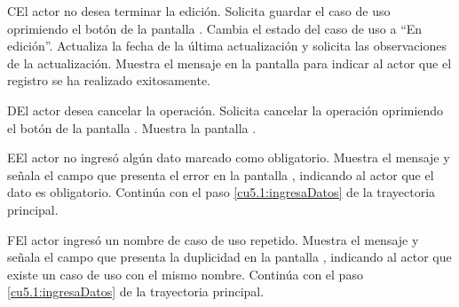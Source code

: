  \begin{UCtrayectoriaA}{C}{El actor no desea terminar la edición.}
    \UCpaso[\UCactor] Solicita guardar el caso de uso oprimiendo el botón  de la pantalla .
    \UCpaso[\UCsist] Cambia el estado del caso de uso a ``En edición''.
    \UCpaso[\UCsist] Actualiza la fecha de la última actualización y solicita las observaciones de la actualización.
    \UCpaso[\UCsist] Muestra el mensaje  en la pantalla  
    para indicar al actor que el registro se ha realizado exitosamente.
 \end{UCtrayectoriaA}
 \begin{UCtrayectoriaA}{D}{El actor desea cancelar la operación.}
    \UCpaso[\UCactor] Solicita cancelar la operación oprimiendo el botón  de la pantalla .
    \UCpaso[\UCsist] Muestra la pantalla .
 \end{UCtrayectoriaA}
 \begin{UCtrayectoriaA}{E}{El actor no ingresó algún dato marcado como obligatorio.}
    \UCpaso[\UCsist] Muestra el mensaje  y señala el campo que presenta el error en la pantalla 
	    , indicando al actor que el dato es obligatorio.
    \UCpaso[] Continúa con el paso \ref{cu5.1:ingresaDatos} de la trayectoria principal.
 \end{UCtrayectoriaA}
 \begin{UCtrayectoriaA}{F}{El actor ingresó un nombre de caso de uso repetido.}
    \UCpaso[\UCsist] Muestra el mensaje  y señala el campo que presenta la duplicidad en la pantalla 
	    , indicando al actor que existe un caso de uso con el mismo nombre.
    \UCpaso[] Continúa con el paso \ref{cu5.1:ingresaDatos} de la trayectoria principal.
 \end{UCtrayectoriaA}
